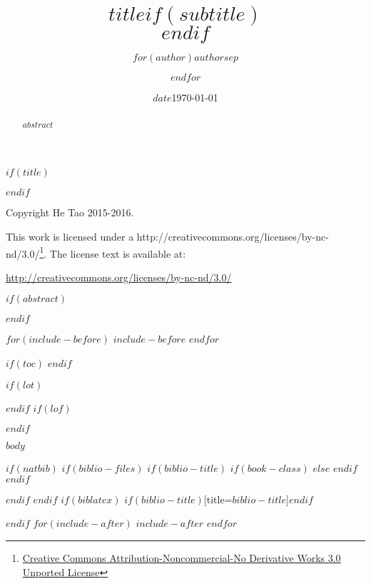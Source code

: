 \documentclass[$if(fontsize)$$fontsize$,$endif$$if(lang)$$lang$,$endif$$if(papersize)$$papersize$,$endif$$for(classoption)$$classoption$$sep$,$endfor$]{$documentclass$}
\title{\huge $title$$if(subtitle)$\\\vspace{0.5em}{\large $subtitle$}$endif$}
\author{$for(author)$$author$$sep$ \and $endfor$}
\date{$date$}
\date{\today}
\renewcommand{\href}[2]{#2\footnote{\url{#1}}}
\begin{document}
$if(title)$
\maketitle
$endif$

\thispagestyle{empty}
\mbox{}\vfill
\begin{center}
Copyright He Tao 2015-2016.

This work is licensed under a \href{Creative Commons Attribution-Noncommercial-No Derivative Works 3.0
Unported License}{http://creativecommons.org/licenses/by-nc-nd/3.0/}. The license text is available at:
\end{center}

\begin{center}
\url{http://creativecommons.org/licenses/by-nc-nd/3.0/}
\end{center}

\renewcommand{\contentsname}{目\qquad 录}
\tableofcontents
\thispagestyle{empty}
\newpage

$if(abstract)$
\begin{abstract}
$abstract$
\end{abstract}
$endif$

$for(include-before)$
$include-before$
$endfor$

$if(toc)$
{
\hypersetup{colorlinks=true,linktoc=all,linkcolor=black}
\setcounter{tocdepth}{$toc-depth$}
\tableofcontents
}
$endif$

$if(lot)$
\listoftables
$endif$
$if(lof)$
\listoffigures
$endif$

$body$

$if(natbib)$
$if(biblio-files)$
$if(biblio-title)$
$if(book-class)$
\renewcommand\bibname{$biblio-title$}
$else$
\renewcommand\refname{$biblio-title$}
$endif$
$endif$


$endif$
$endif$
$if(biblatex)$
\printbibliography$if(biblio-title)$[title=$biblio-title$]$endif$

$endif$
$for(include-after)$
$include-after$
$endfor$
\end{document}
